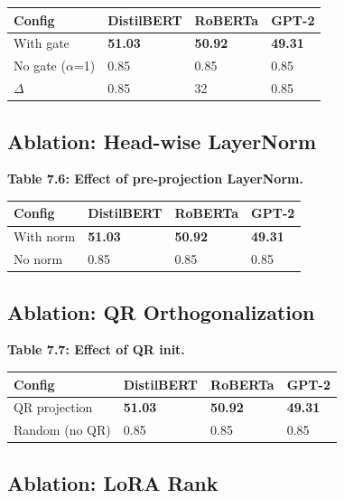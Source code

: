 \begin{table}[H]
\centering
\small
\begin{tabular}{llll}
\toprule
\textbf{Config} & \textbf{DistilBERT} & \textbf{RoBERTa} & \textbf{GPT-2} \\
\midrule
With gate & \textbf{51.03} & \textbf{50.92} & \textbf{49.31} \\
No gate ($\alpha$=1) & 0.85 & 0.85 & 0.85 \\
$\Delta$ & 0.85 & 32 & 0.85 \\
\bottomrule
\end{tabular}
\end{table}

\subsection{Ablation: Head-wise LayerNorm}

\textbf{Table 7.6: Effect of pre-projection LayerNorm.}

\begin{table}[H]
\centering
\small
\begin{tabular}{llll}
\toprule
\textbf{Config} & \textbf{DistilBERT} & \textbf{RoBERTa} & \textbf{GPT-2} \\
\midrule
With norm & \textbf{51.03} & \textbf{50.92} & \textbf{49.31} \\
No norm & 0.85 & 0.85 & 0.85 \\
\bottomrule
\end{tabular}
\end{table}

\subsection{Ablation: QR Orthogonalization}

\textbf{Table 7.7: Effect of QR init.}

\begin{table}[H]
\centering
\small
\begin{tabular}{llll}
\toprule
\textbf{Config} & \textbf{DistilBERT} & \textbf{RoBERTa} & \textbf{GPT-2} \\
\midrule
QR projection & \textbf{51.03} & \textbf{50.92} & \textbf{49.31} \\
Random (no QR) & 0.85 & 0.85 & 0.85 \\
\bottomrule
\end{tabular}
\end{table}

\subsection{Ablation: LoRA Rank}

